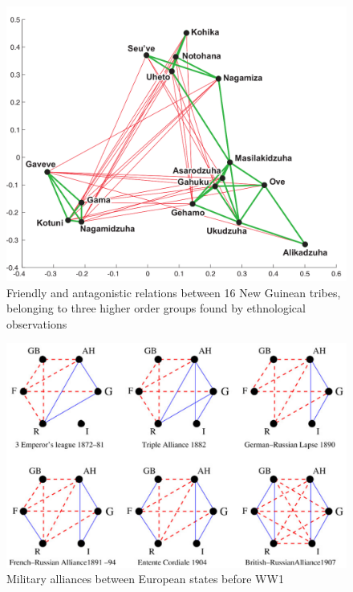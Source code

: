 \documentclass[final,xcolor=svgnames,A4]{beamer}
\begin{document}
\begin{frame}
	\begin{figure}[h]
		\centering
		\includegraphics[width=0.75\linewidth]{tribes.png}
		\caption{Friendly and antagonistic relations between 16 New Guinean
			tribes, belonging to three higher order groups found by
			ethnological observations \autocite{Luca10}}
	\end{figure}
\end{frame}

\begin{frame}
	\begin{figure}[h]
		\centering
		\includegraphics[width=0.8\linewidth]{europe.png}
		\caption{Military alliances between European states before WW1 \autocite{Antal2006a}}
	\end{figure}
\end{frame}
\end{document}
